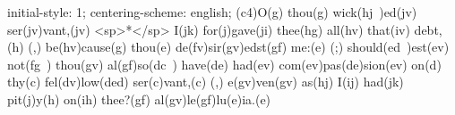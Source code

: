 initial-style: 1;
centering-scheme: english;
(c4)O(g) thou(g) wick(hj~)ed(jv) ser(jv)vant,(jv) <sp>*</sp> I(jk) for(j)gave(ji) thee(hg) all(hv) that(iv) debt,(h) (,) be(hv)cause(g) thou(e) de(fv)sir(gv)edst(gf) me:(e) (;) should(ed~)est(ev) not(fg~) thou(gv) al(gf)so(dc~) have(de) had(ev) com(ev)pas(de)sion(ev) on(d) thy(c) fel(dv)low(ded) ser(c)vant,(c) (,) e(gv)ven(gv) as(hj) I(ij) had(jk) pit(j)y(h) on(ih) thee?(gf) al(gv)le(gf)lu(e)ia.(e)
